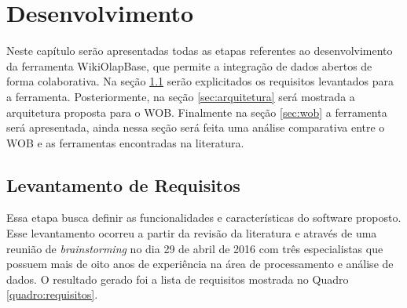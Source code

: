 \chapter{Desenvolvimento}
\label{chap:desenvolvimento}

Neste capítulo serão apresentadas todas as etapas referentes ao desenvolvimento da ferramenta
WikiOlapBase, que permite a integração de dados abertos de forma colaborativa. Na seção
\ref{sec:requisitos} serão explicitados os requisitos levantados para a ferramenta. 
Posteriormente, na seção \ref{sec:arquitetura} será mostrada a arquitetura proposta para o 
WOB. Finalmente na seção \ref{sec:wob} a ferramenta será apresentada, ainda nessa seção será 
feita uma análise comparativa entre o WOB e as ferramentas encontradas na literatura.

\section{Levantamento de Requisitos}
\label{sec:requisitos}

Essa etapa busca definir as funcionalidades e características do software proposto. Esse 
levantamento ocorreu a partir da revisão da literatura e através de uma reunião de 
\textit{brainstorming} no dia 29 de abril de 2016 com três especialistas que possuem mais 
de oito anos de experiência na área de processamento e análise de dados. O resultado gerado 
foi a lista de requisitos mostrada no Quadro \ref{quadro:requisitos}.

